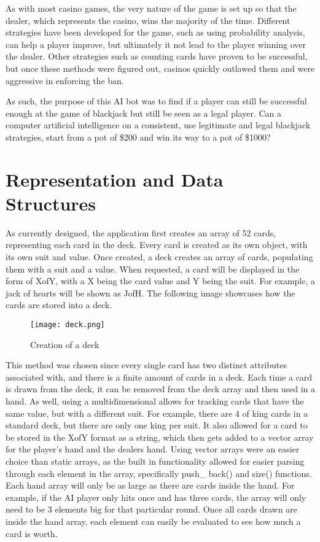 {\setlength{\parindent}{0cm}

As with most casino games, the very nature of the game is set up so that the dealer, which represents the casino, wins the majority of the time. Different strategies have been developed for the game, such as using probability analysis, can help a player improve, but ultimately it not lead to the player winning over the dealer. Other strategies such as counting cards have proven to be successful, but once these methods were figured out, casinos quickly outlawed them and were aggressive in enforcing the ban.  
\newline
{\setlength{\parindent}{0cm}

As such, the purpose of this AI bot was to find if a player can still be successful enough at the game of blackjack but still be seen as a legal player. Can a computer artificial intelligence on a consistent, use legitimate and legal blackjack strategies, start from a pot of \$200 and win its way to a pot of \$1000?

\section{Representation and Data Structures}
As currently designed, the application first creates an array of 52 cards, representing each card in the deck. Every card is created as its own object, with its own suit and value. Once created, a deck creates an array of cards, populating them with a suit and a value. When requested, a card will be displayed in the form of XofY, with a X being the card value and Y being the suit. For example, a jack of hearts will be shown as JofH. The following image showcases how the cards are stored into a deck.
\begin{figure}[h]
	\centering
	\texttt{[image: deck.png]}\\
	\caption{Creation of a deck}
	\label{fig:tobias}
\end{figure}

This method was chosen since every single card has two distinct attributes associated with, and there is a finite amount of cards in a deck. Each time a card is drawn from the deck, it can be removed from the deck array and then used in a hand. As well, using a multidimensional allows for tracking cards that have the same value, but with a different suit. For example, there are 4 of king cards in a standard deck, but there are only one king per suit. It also allowed for a card to be stored  in the XofY format as a string, which then gets added to a vector array for the player's hand and the dealers hand. Using vector arrays were an easier choice than static arrays, as the built in functionality allowed for easier parsing through each element in the array, specifically push\_ back() and size() functions. Each hand array will only be as large as there are cards inside the hand. For example, if the AI player only hits once and has three cards, the array will only need to be 3 elements big for that particular round. Once all cards drawn are inside the hand array, each element can easily be evaluated to see how much a card is worth. 

}}
